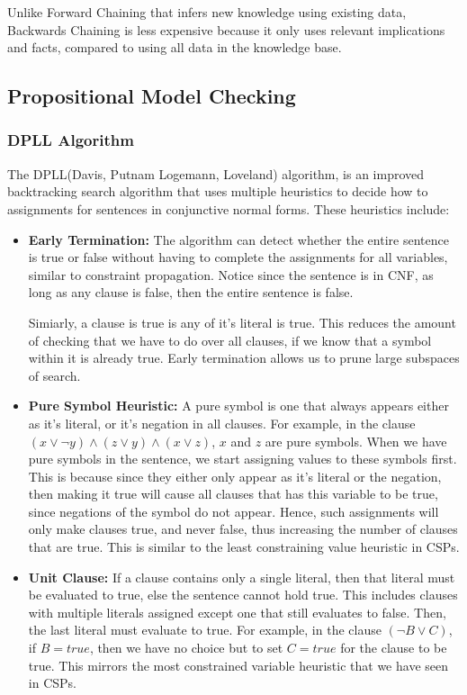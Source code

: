 \documentclass[12pt]{article}
\begin{document}
Unlike Forward Chaining that infers new knowledge using existing data, Backwards Chaining is less expensive because it only uses relevant implications and facts, compared to using all data in the knowledge base.  

\subsection{Propositional Model Checking}

\subsubsection{DPLL Algorithm}

The DPLL(Davis, Putnam Logemann, Loveland) algorithm, is an improved backtracking search algorithm that uses multiple heuristics to decide how to assignments for sentences in conjunctive normal forms. These heuristics include:

\begin{itemize}
\item\textbf{Early Termination:} The algorithm can detect whether the entire sentence is true or false without having to complete the assignments for all variables, similar to constraint propagation. Notice since the sentence is in CNF, as long as any clause is false, then the entire sentence is false.

Simiarly, a clause is true is any of it's literal is true. This reduces the amount of checking that we have to do over all clauses, if we know that a symbol within it is already true. Early termination allows us to prune large subspaces of search.

\item \textbf{Pure Symbol Heuristic:} A pure symbol is one that always appears either as it's literal, or it's negation in all clauses. For example, in the clause $(x \lor \lnot y) \land (z \lor y) \land (x \lor z)$, $x$ and $z$ are pure symbols. When we have pure symbols in the sentence, we start assigning values to these symbols first. This is because since they either only appear as it's literal or the negation, then making it true will cause all clauses that has this variable to be true, since negations of the symbol do not appear. Hence, such assignments will only make clauses true, and never false, thus increasing the number of clauses that are true. This is similar to the least constraining value heuristic in CSPs.

\item \textbf{Unit Clause:} If a clause contains only a single literal, then that literal must be evaluated to true, else the sentence cannot hold true. This includes clauses with multiple literals assigned except one that still evaluates to false. Then, the last literal must evaluate to true. For example, in the clause $(\lnot B \lor C)$, if $B = true$, then we have no choice but to set $C = true$ for the clause to be true. This mirrors the most constrained variable heuristic that we have seen in CSPs.
\end{itemize}
\end{document}
